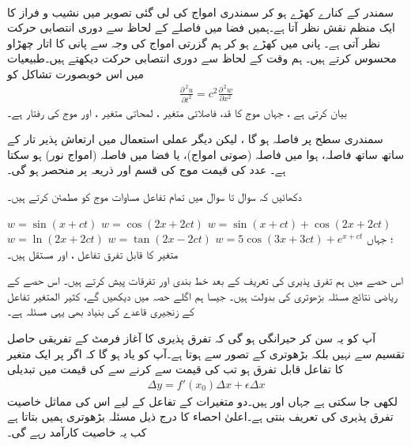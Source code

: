 \\
سمندر  کے کنارے کھڑے  ہو کر سمندری امواج کی لی گئی  تصویر  میں نشیب و فراز کا   ایک منظم نقش نظر آتا ہے۔ہمیں  فضا میں  فاصلے  کے لحاظ سے   دوری   انتصابی حرکت نظر آتی ہے۔ پانی میں کھڑے ہو کر ہم گزرتی امواج کی وجہ سے پانی کا اتار چھڑاو محسوس کرتے ہیں۔ ہم وقت کے لحاظ سے دوری انتصابی حرکت  دیکھتے ہیں۔طبیعیات  میں اس خوبصورت   تشاکل کو 
\begin{align}
\frac{\partial^{\,2}u}{\partial t^2}=c^2\frac{\partial ^{\,2}w}{\partial x^2}
\end{align}
بیان کرتی ہے ، جہاں   موج   کا قد، فاصلاتی متغیر  ، لمحاتی متغیر ،  اور موج کی رفتار    ہے۔ 

سمندری سطح پر فاصلہ  ہو گا ، لیکن دیگر عملی استعمال میں   ارتعاش پذیر  تار کے ساتھ ساتھ  فاصلہ، ہوا میں فاصلہ (صوتی امواج)، یا فضا میں فاصلہ  (امواج نور)  ہو سکتا ہے۔  عدد  کی قیمت موج کی قسم اور  ذریعہ پر منحصر ہو  گی۔

دکھائیں کہ سوال  تا سوال   میں تمام  تفاعل  مساوات موج  کو مطمئن کرتے ہیں۔ 

$w=\sin(x+ct)$
$w=\cos(2x+2ct)$
$w=\sin(x+ct)+\cos(2x+2ct)$
$w=\ln(2x+2ct)$
$w=\tan(2x-2ct)$
$w=5\cos(3x+3ct)+e^{x+ct}$
؛ جہاں  متغیر  کا قابل تفرق تفاعل ،   اور   مستقل ہیں۔



اس حصے  میں ہم تفرق پذیری کی تعریف    کے بعد  خط بندی اور  تفرقات   پیش کرتے ہیں۔ اس حصے کے  ریاضی نتائج مسئلہ  بڑھوتری کی بدولت  ہیں۔ جیسا ہم اگلے حصہ میں دیکھیں گے، کثیر المتغیر تفاعل کے  زنجیری قاعدے کی بنیاد بھی یہی مسئلہ ہے۔

آپ  کو یہ سن کر حیرانگی ہو گی کہ تفرق پذیری کا  آغاز فرمٹ کے  تفریقی  حاصل تقسیم  سے نہیں بلکہ بڑھوتری کے تصور سے ہوتا ہے۔آپ کو یاد ہو گا کہ اگر  پر ایک متغیر کا تفاعل  قابل تفرق ہو  تب  کی قیمت  سے    کرنے سے  کی قیمت میں تبدیلی 
\begin{align}
\Delta y=f'(x_0)\Delta x+\epsilon \Delta x
\end{align}
لکھی جا سکتی ہے جہاں  اور  ہیں۔دو متغیرات کے تفاعل  کے لیے   اس کی مماثل  خاصیت تفرق پذیری کی تعریف  بنتی ہے۔اعلیٰ  احصاء کا درج ذیل    مسئلہ بڑھوتری ہمیں بتاتا ہے  کب یہ خاصیت  کارآمد  رہے   گی۔

